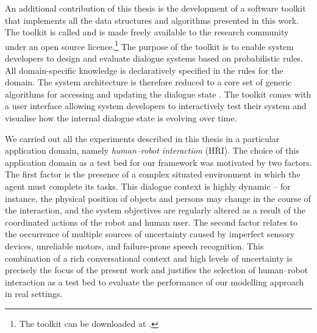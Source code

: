 An additional contribution of this thesis is the development of a software toolkit that implements all the data structures and algorithms presented in this work. The toolkit is called \opendial{}  and is made freely available to the research community under an open source licence.\footnote{The toolkit can be downloaded at .} The purpose of the toolkit is to enable system developers to design and evaluate dialogue systems based on probabilistic rules. All domain-specific knowledge is declaratively specified in the rules for the domain. The system architecture is therefore reduced to a core set of generic algorithms for accessing and updating the dialogue state \citep{lison-semdial2012}. The \opendial{} toolkit comes with a user interface allowing system developers to interactively test their system and visualise how the internal dialogue state is evolving over time.  %

We carried out all the experiments described in this thesis in a particular application domain, namely \textit{human--robot interaction}  (HRI).  The choice of this application domain as a test bed for our framework was motivated by two factors.  The first factor is the presence of a complex situated environment in which the agent must complete its tasks.  This dialogue context is highly dynamic -- for instance, the physical position of objects and persons may change in the course of the interaction, and the system objectives are regularly altered as a result of the coordinated actions of the robot and human user. The second factor relates to the occurrence of multiple sources of uncertainty caused by imperfect sensory devices, unreliable motors, and failure-prone speech recognition. This combination of a rich conversational context and high levels of uncertainty is precisely the focus of the present work and justifies the selection of  human--robot interaction as a test bed to evaluate the performance of our modelling approach in real settings.

